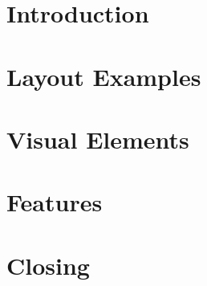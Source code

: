 \section{Introduction}





% 












% 
% 


% 
% 

% 
% 

% 
% 
% 

% 
% 

% 
% 

% 

\section{Layout Examples}
% 
% 

\section{Visual Elements}
% 
% 
% 

\section{Features}

% 
% 
% 
% 

\section{Closing}
